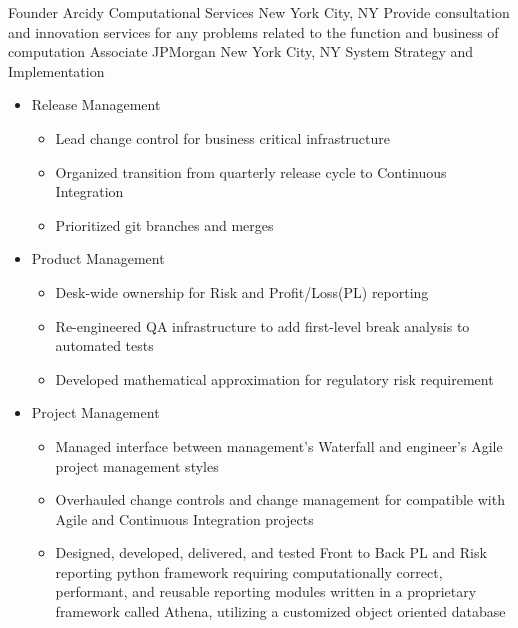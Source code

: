 \documentclass[11pt,letterpaper,roman]{moderncv}
\begin{document}
    {Founder}
    {Arcidy Computational Services}
    {New York City, NY}
    {}
    {Provide consultation and innovation services for any problems related to the function and business of computation}
    {Associate}
    {JPMorgan}
    {New York City, NY}
    {}
    {System Strategy and Implementation}
\begin{itemize}
    \item Release Management
        \begin{itemize}
           \item Lead change control for business critical infrastructure
           \item Organized transition from quarterly release cycle to Continuous Integration
           \item Prioritized git branches and merges
        \end{itemize}
    \item Product Management
        \begin{itemize}
           \item Desk-wide ownership for Risk and Profit/Loss(PL) reporting
           \item Re-engineered QA infrastructure to add first-level break analysis to automated tests
           \item Developed mathematical approximation for regulatory risk requirement
        \end{itemize}
    \item Project Management
        \begin{itemize}
           \item Managed interface between management's Waterfall and engineer's Agile project management styles
           \item Overhauled change controls and change management for compatible with Agile and Continuous Integration projects
           \item Designed, developed, delivered, and tested Front to Back PL and Risk reporting python framework requiring computationally correct, performant, and reusable reporting modules written in a proprietary framework called Athena, utilizing a customized object oriented database

\end{itemize}
\end{itemize}
\end{document}
